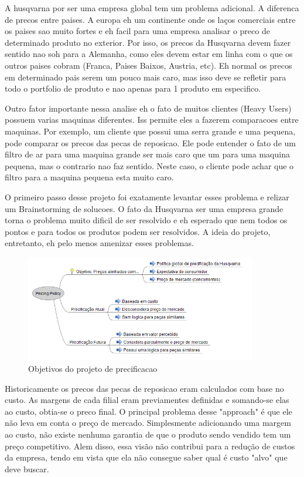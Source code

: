 \documentclass[12pt]{article}
\begin{document}
	A husqvarna por ser uma empresa global tem um problema adicional. A diferenca de precos entre paises. A europa eh um continente onde os laços comerciais entre os paises sao muito fortes e eh facil para uma empresa analisar o preco de determinado produto no exterior. Por isso, os precos da Husqvarna devem fazer sentido nao soh para a Alemanha, como eles devem estar em linha com o que os outros paises cobram (Franca, Paises Baixos, Austria, etc). Eh normal os precos em determinado pais serem um pouco mais caro, mas isso deve se refletir para todo o portfolio de produto e nao apenas para 1 produto em especifico.

	Outro fator importante nessa analise eh o fato de muitos clientes (Heavy Users) possuem varias maquinas diferentes. Iss permite eles a fazerem comparacoes entre maquinas. Por exemplo, um cliente que possui uma serra grande e uma pequena, pode comparar os precos das pecas de reposicao. Ele pode entender o fato de um filtro de ar para uma maquina grande ser mais caro que um para uma maquina pequena, mas o contrario nao faz sentido. Neste caso, o cliente pode achar que o filtro para a maquina pequena esta muito caro.

	O primeiro passo desse projeto foi exatamente levantar esses problema e relizar um Brainstorming de solucoes. O fato da Husqvarna ser uma empresa grande torna o problema muito dificil de ser resolvido e eh esperado que nem todos os pontos e para todos os produtos podem ser resolvidos. A ideia do projeto, entretanto, eh pelo menos amenizar esses problemas.

\begin{figure}[h!]
	\centering
	\includegraphics[width=0.9\textwidth]{img/pricing.png}
	\caption{Objetivos do projeto de precificacao}
	\label{pricing}
\end{figure}

	Historicamente os precos das pecas de reposicao eram calculados com base no custo. As margens de cada filial eram previamentes definidas e somando-se elas ao custo, obtia-se o preco final. O principal problema desse "approach" é que ele não leva em conta o preço de mercado. Simplesmente adicionando uma margem ao custo, não existe nenhuma garantia de que o produto sendo vendido tem um preço competitivo. Alem disso, essa visão não contribui para a redução de custos da empresa, tendo em vista que ela não consegue saber qual é custo "alvo" que deve buscar.
\end{document}
